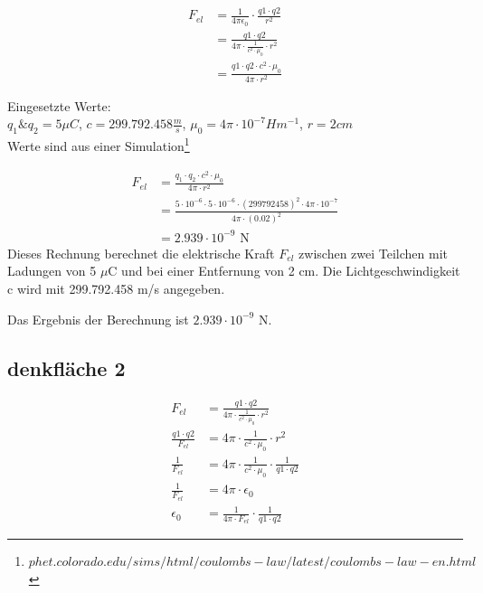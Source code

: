 \documentclass{report}
\begin{document}
\begin{align}
  F_{el} & = \frac{1}{4\pi \epsilon_0} \cdot \frac{q1 \cdot q2}{r^2}\\  
         & = \frac{q1 \cdot q2}{4\pi \cdot \frac{1}{c^2 \cdot \mu_0} \cdot r^2}\\
         & = \frac{q1 \cdot q2 \cdot c^2 \cdot \mu_0}{4\pi \cdot r^2}
\end{align}



Eingesetzte Werte:\\
$q_1 \& q_2 = 5 \mu C$, $c=299.792.458 \frac{m}{s}$, $\mu_0= 4 \pi \cdot 10^{-7}Hm^{-1}$, $r=2cm$\\
Werte sind aus einer Simulation\footnote{$phet.colorado.edu/sims/html/coulombs-law/latest/coulombs-law-en.html$}

\begin{align}
F_{el} &= \frac{q_1 \cdot q_2 \cdot c^2 \cdot \mu_0}{4\pi \cdot r^2} \\
       &= \frac{5\cdot10^{-6} \cdot 5\cdot10^{-6} \cdot (299792458)^2 \cdot 4\pi \cdot 10^{-7}}{4\pi \cdot (0.02)^2} \\
       &= 2.939\cdot10^{-9} \text{ N}
\end{align}
Dieses Rechnung berechnet die elektrische Kraft $F_{el}$ zwischen zwei Teilchen
mit Ladungen von 5 $\mu$C und bei einer Entfernung von 2 cm. Die
Lichtgeschwindigkeit c wird mit 299.792.458 m/s angegeben.

Das Ergebnis der Berechnung ist $2.939\cdot 10^{-9}$ N.

\subsection{denkfläche 2}
\begin{align}
F_{el} &= \frac{q1 \cdot q2}{4\pi \cdot \frac{1}{c^2 \cdot \mu_0} \cdot r^2} \\ %
\frac{q1 \cdot q2}{F_{el}} &= 4\pi \cdot \frac{1}{c^2 \cdot \mu_0} \cdot r^2 \\ %
\frac{1}{F_{el}} &= 4\pi \cdot \frac{1}{c^2 \cdot \mu_0} \cdot \frac{1}{q1 \cdot q2} \\ %
\frac{1}{F_{el}} &= 4\pi \cdot \epsilon_0 \\ %
\epsilon_0 &= \frac{1}{4\pi \cdot F_{el}} \cdot \frac{1}{q1 \cdot q2} %
\end{align}
\end{document}
